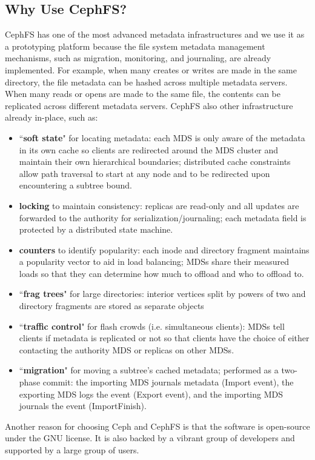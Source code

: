 \subsection*{Why Use CephFS?}
\label{background-why}

CephFS has one of the most advanced metadata infrastructures and we use it as a
prototyping platform because the file system metadata management mechanisms,
such as migration, monitoring, and journaling, are already implemented.  For
example, when many creates or writes are made in the same directory, the file
metadata can be hashed across multiple metadata servers. When many reads or
opens are made to the same file, the contents can be replicated across
different metadata servers. CephFS also other infrastructure already in-place,
such as: 

\begin{itemize}

\item ``\textbf{soft state}" for locating metadata: each MDS is only aware of
the metadata in its own cache so clients are redirected around the MDS cluster
and maintain their own hierarchical boundaries; distributed cache constraints
allow path traversal to start at any node and to be redirected upon
encountering a subtree bound.

\item \textbf{locking} to maintain consistency: replicas are read-only and all
updates are forwarded to the authority for serialization/journaling; each
metadata field is protected by a distributed state machine.

\item \textbf{counters} to identify popularity: each inode and directory
fragment maintains a popularity vector to aid in load balancing; MDSs share
their measured loads so that they can determine how much to offload and who to
offload to.

\item ``\textbf{frag trees}" for large directories: interior vertices split by
powers of two and directory fragments are stored as separate objects

\item ``\textbf{traffic control}" for flash crowds (i.e.  simultaneous
clients): MDSs tell clients if metadata is replicated or not so that clients
have the choice of either contacting the authority MDS or replicas on other
MDSs.

\item ``\textbf{migration}" for moving a subtree's cached metadata; performed
as a two-phase commit: the importing MDS journals metadata (Import event), the
exporting MDS logs the event (Export event), and the importing MDS journals the
event (ImportFinish). 

\end{itemize}

Another reason for choosing Ceph and CephFS is that the software is open-source
under the GNU license. It is also backed by a vibrant group of developers and
supported by a large group of users.
